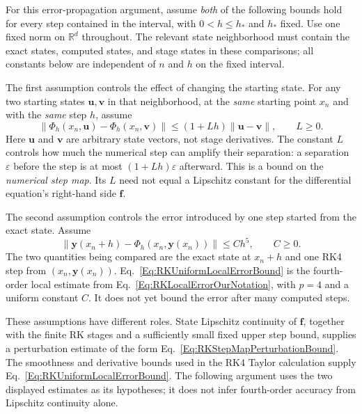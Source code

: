 For this error-propagation argument, assume \emph{both} of the following
bounds hold for every step contained in the interval, with
$0<h\leq h_\ast$ and $h_\ast$ fixed. Use one fixed norm
on $\mathbb R^d$ throughout. The relevant state neighborhood must contain
the exact states, computed states, and stage states in these comparisons;
all constants below are independent of $n$ and $h$ on the fixed interval.

The first assumption controls the effect of changing the starting state.
For any two starting states $\mathbf u,\mathbf v$ in that neighborhood,
at the \emph{same} starting point $x_n$ and with the \emph{same} step $h$,
assume
\begin{equation}\label{Eq:RKStepMapPerturbationBound}
 \|\Phi_h(x_n,\mathbf u)-\Phi_h(x_n,\mathbf v)\|
 \leq(1+Lh)\|\mathbf u-\mathbf v\|,\qquad L\geq0.
\end{equation}
Here $\mathbf u$ and $\mathbf v$ are arbitrary state vectors, not stage
derivatives. The constant $L$ controls how much the numerical step can
amplify their separation: a separation $\varepsilon$ before the step
is at most $(1+Lh)\varepsilon$ afterward. This is a bound on the
\emph{numerical step map}. Its $L$ need not equal a Lipschitz constant
for the differential equation's right-hand side $\mathbf f$.

The second assumption controls the error introduced by one step started
from the exact state. Assume
\begin{equation}\label{Eq:RKUniformLocalErrorBound}
 \|\mathbf y(x_n+h)-\Phi_h(x_n,\mathbf y(x_n))\|
 \leq Ch^5,\qquad C\geq0.
\end{equation}
The two quantities being compared are the exact state at $x_n+h$ and
one RK4 step from $(x_n,\mathbf y(x_n))$. Eq.~\ref{Eq:RKUniformLocalErrorBound}
is the fourth-order local estimate from
Eq.~\ref{Eq:RKLocalErrorOurNotation}, with $p=4$ and a uniform constant $C$.
It does not yet bound the error after many computed steps.

These assumptions have different roles. State Lipschitz continuity of
$\mathbf f$, together with the finite RK stages and a sufficiently small
fixed upper step bound, supplies a perturbation estimate of the form
Eq.~\ref{Eq:RKStepMapPerturbationBound}. The smoothness and derivative
bounds used in the RK4 Taylor calculation supply
Eq.~\ref{Eq:RKUniformLocalErrorBound}. The following argument uses the two
displayed estimates as its hypotheses; it does not infer fourth-order
accuracy from Lipschitz continuity alone.

